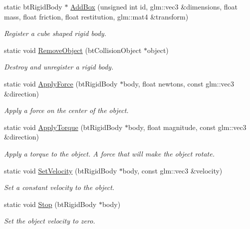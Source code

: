 \begin{DoxyCompactItemize}
static bt\+Rigid\+Body $\ast$ \hyperlink{classTarbora_1_1PhysicsEngine_a4ec40e1a3ab05c7fe1e0216534484750}{Add\+Box} (unsigned int id, glm\+::vec3 \&dimensions, float mass, float friction, float restitution, glm\+::mat4 \&transform)
\begin{DoxyCompactList}\small\item\em Register a cube shaped rigid body. \end{DoxyCompactList}\item 
static void \hyperlink{classTarbora_1_1PhysicsEngine_a4debfab1c812e22ccd4f65b0b7e9cea7}{Remove\+Object} (bt\+Collision\+Object $\ast$object)
\begin{DoxyCompactList}\small\item\em Destroy and unregister a rigid body. \end{DoxyCompactList}\item 
static void \hyperlink{classTarbora_1_1PhysicsEngine_a83b98f62953485af3b5e04d6bf4adba9}{Apply\+Force} (bt\+Rigid\+Body $\ast$body, float newtons, const glm\+::vec3 \&direction)
\begin{DoxyCompactList}\small\item\em Apply a force on the center of the object. \end{DoxyCompactList}\item 
static void \hyperlink{classTarbora_1_1PhysicsEngine_a7bfaabd962f0825536195708d4442a3d}{Apply\+Torque} (bt\+Rigid\+Body $\ast$body, float magnitude, const glm\+::vec3 \&direction)
\begin{DoxyCompactList}\small\item\em Apply a torque to the object. A force that will make the object rotate. \end{DoxyCompactList}\item 
static void \hyperlink{classTarbora_1_1PhysicsEngine_a1c4650ee51cd6094b6faa141206a6403}{Set\+Velocity} (bt\+Rigid\+Body $\ast$body, const glm\+::vec3 \&velocity)
\begin{DoxyCompactList}\small\item\em Set a constant velocity to the object. \end{DoxyCompactList}\item 
\mbox{\label{classTarbora_1_1PhysicsEngine_aca13d6e0e807662cd096fe899c5b8776}} 
static void \hyperlink{classTarbora_1_1PhysicsEngine_aca13d6e0e807662cd096fe899c5b8776}{Stop} (bt\+Rigid\+Body $\ast$body)
\begin{DoxyCompactList}\small\item\em Set the object velocity to zero. \end{DoxyCompactList}\end{DoxyCompactItemize}


